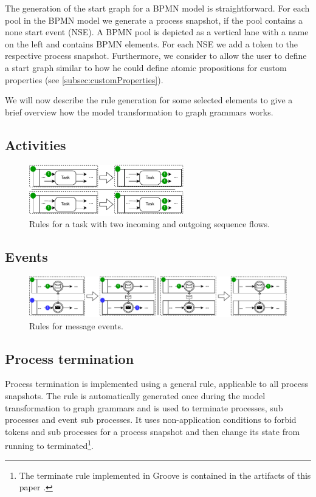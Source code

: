 \documentclass[adraft, copyright, creativecommons]{eptcs} %
\begin{document}
The generation of the start graph for a BPMN model is straightforward.
For each pool in the BPMN model we generate a process snapshot, if the pool contains a none start event (NSE).
A BPMN pool is depicted as a vertical lane with a name on the left and contains BPMN elements.
For each NSE we add a token to the respective process snapshot.
Furthermore, we consider to allow the user to define a start graph similar to how he could define atomic propositions for custom properties (see \cref{subsec:customProperties}).

We will now describe the rule generation for some selected elements to give a brief overview how the model transformation to graph grammars works.
\subsection{Activities}
\begin{figure}[h]
    \centering
    \includegraphics[width=0.6\textwidth]{images/bpmn_semantics-task-rules.pdf}
    \caption{Rules for a task with two incoming and outgoing sequence flows.}
    \label{fig:taskRules}
\end{figure}

\subsection{Events}
\begin{figure}[h]
    \centering
    \includegraphics[width=1\textwidth]{images/bpmn_semantics-message-events.pdf}
    \caption{Rules for message events.}
    \label{fig:messageEventRules}
\end{figure}

\subsection{Process termination}
Process termination is implemented using a general rule, applicable to all process snapshots.
The rule is automatically generated once during the model transformation to graph grammars and is used to terminate processes, sub processes and event sub processes.
It uses non-application conditions to forbid tokens and sub processes for a process snapshot and then change its state from running to terminated\footnote{The terminate rule implemented in Groove is contained in the artifacts of this paper \cite{timkrauterArtifactsTERMGRAPH2022}.}.
\end{document}
